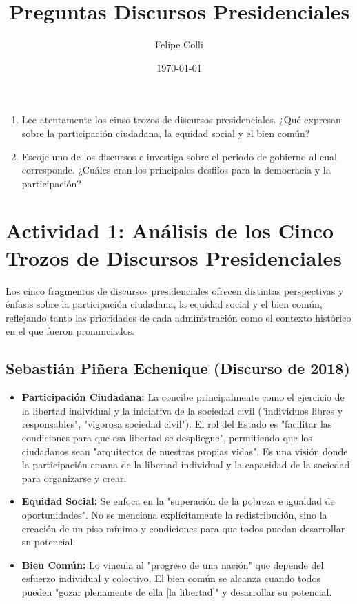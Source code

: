 \documentclass[11pt]{article}
\title{Preguntas Discursos Presidenciales}
\author{Felipe Colli}
\date{\today}
\begin{document}
\maketitle
\newpage
\begin{enumerate}
    \item Lee atentamente los cinso trozos de discursos presidenciales. ¿Qué expresan sobre la participación ciudadana, la equidad social y el bien común? \\

    \item Escoje uno de los discursos e investiga sobre el periodo de gobierno al cual corresponde. ¿Cuáles eran los principales desfiíos para la democracia y la participación?
\end{enumerate}

\section*{Actividad 1: Análisis de los Cinco Trozos de Discursos Presidenciales}
\label{sec:actividad1}

Los cinco fragmentos de discursos presidenciales ofrecen distintas perspectivas y énfasis sobre la participación ciudadana, la equidad social y el bien común, reflejando tanto las prioridades de cada administración como el contexto histórico en el que fueron pronunciados.

\subsection*{Sebastián Piñera Echenique (Discurso de 2018)}
\begin{itemize}
    \item \textbf{Participación Ciudadana:} La concibe principalmente como el ejercicio de la libertad individual y la iniciativa de la sociedad civil ("individuos libres y responsables", "vigorosa sociedad civil"). El rol del Estado es "facilitar las condiciones para que esa libertad se despliegue", permitiendo que los ciudadanos sean "arquitectos de nuestras propias vidas". Es una visión donde la participación emana de la libertad individual y la capacidad de la sociedad para organizarse y crear.
    \item \textbf{Equidad Social:} Se enfoca en la "superación de la pobreza e igualdad de oportunidades". No se menciona explícitamente la redistribución, sino la creación de un piso mínimo y condiciones para que todos puedan desarrollar su potencial.
    \item \textbf{Bien Común:} Lo vincula al "progreso de una nación" que depende del esfuerzo individual y colectivo. El bien común se alcanza cuando todos pueden "gozar plenamente de ella [la libertad]" y desarrollar su potencial.
\end{itemize}
\end{document}
